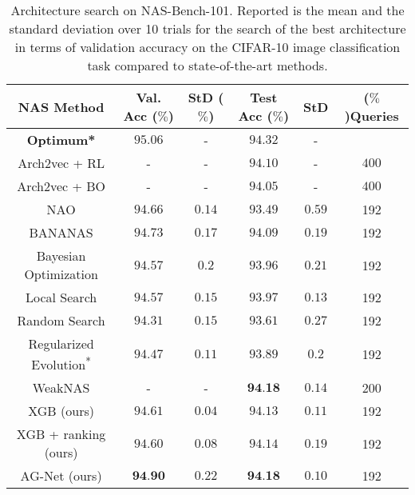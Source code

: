 \documentclass[runningheads]{llncs}
\begin{document}
\begin{table}[h]
	\scriptsize
	\begin{center}
		\caption{Architecture search on NAS-Bench-101. Reported is the mean and the standard deviation over 10 trials for the search of the best architecture in terms of validation accuracy on the CIFAR-10 image classification task compared to state-of-the-art methods.}
		\label{tab:NB101_Search_supp}
		\begin{tabular}{c||c|c|c|c||c}
			\toprule
			\textbf{NAS Method}  & \textbf{Val. Acc} ($\%$) & \textbf{StD} ($\%$)& \textbf{Test Acc} ($\%$) &  \textbf{StD} & ($\%$)\textbf{Queries} \\
			\midrule
			\textbf{Optimum*} & $95.06$ & - & $94.32$& - & \\
			\midrule
			Arch2vec + RL \cite{2020Arch2vec} & - & - & $94.10$ & - & $400$\\
			Arch2vec + BO \cite{2020Arch2vec}& - & - & $94.05$ & - & $400$\\
			NAO \textsuperscript{\ddag}\cite{2018NAO} & $94.66$ & $0.14 $ &
			$93.49 $ & $0.59 $ & 192 \\
			BANANAS\textsuperscript{\textdagger} \cite{2021BANANAS} & $94.73 $ & $ 0.17$ & $94.09 $ & $0.19$ & 192 \\
			Bayesian Optimization\textsuperscript{\textdagger} \cite{2015DNGO}  & $94.57 $ & $ 0.2 $ &  $93.96 $ & $ 0.21$ & 192 \\
			Local Search\textsuperscript{\textdagger} \cite{2020LocalSearchNAS}  & $94.57 $ & $ 0.15$ & $93.97 $ & $ 0.13$ & 192\\
			Random Search\textsuperscript{\textdagger}\cite{2019RS}  & $94.31 $ & $ 0.15$ & $93.61 $ & $ 0.27$  & 192 \\
			Regularized Evolution\textsuperscript{*}\cite{2019EvolutionaryNAS}  & $94.47 $ & $ 0.11$ & $93.89 $ & $ 0.2$ & 192 \\
			WeakNAS \cite{2021WeakNAS} & - & - & $\textbf{94.18} $ & $ 0.14$ & 200 \\
			\midrule
			XGB (ours) & $94.61 $ & $ 0.04$ & $94.13 $ & $ 0.11 $ & 192 \\
			XGB + ranking (ours) & $94.60 $ & $ 0.08$ & $94.14 $ & $ 0.19$ & 192 \\
			AG-Net (ours)  & $\textbf{94.90} $ & $ 0.22$ & $\textbf{94.18} $ & $ 0.10$  & 192
			\\
			\bottomrule
		\end{tabular}
	\end{center}
\end{table}
\end{document}
